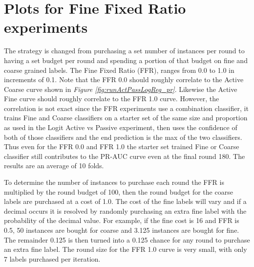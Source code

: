 \documentclass[ms]{nuthesis}
\begin{document}
\section{Plots for Fine Fixed Ratio experiments}
\label{ffrSection}
\par The strategy is changed from purchasing a set number of instances
    per round to having a set budget per round and spending a portion of that budget
    on fine and coarse grained labels. The Fine Fixed Ratio (FFR), ranges from 0.0 to
    1.0 in increments of 0.1. Note that the FFR 0.0 should roughly correlate to the
    Active Coarse curve shown in \textit{Figure \ref{fig:runActPassLogReg_pr}}. Likewise
    the Active Fine curve should roughly correlate to the FFR 1.0 curve. However, the correlation
    is not exact since the FFR experiments use a combination classifier, it trains Fine and
    Coarse classifiers on a starter set of the same size and proportion as used in the
    Logit Active vs Passive experiment, then uses the confidence of both of those classifiers and
    the end prediction is the max of the two classifiers. Thus even for the FFR 0.0 and FFR 1.0
    the starter set trained Fine or Coarse classifier still contributes to the PR-AUC curve
    even at the final round 180. The results are an average of 10 folds.

    \par To determine the number of instances to purchase each round the FFR is multiplied by the
    round budget of 100, then the round budget for the coarse labels are purchased at a cost of 1.0.
    The cost of the fine labels will vary and if a decimal occurs it is resolved by randomly purchasing
    an extra fine label with the probability of the decimal value. For example, if the fine cost is 16 and
    FFR is 0.5, 50 instances are bought for coarse and 3.125 instances are
    bought for fine. The remainder 0.125 is then turned into a 0.125 chance for any round to
    purchase an extra fine label. The round size for the FFR 1.0 curve is very small, with only
    7 labels purchased per iteration.
\end{document}
